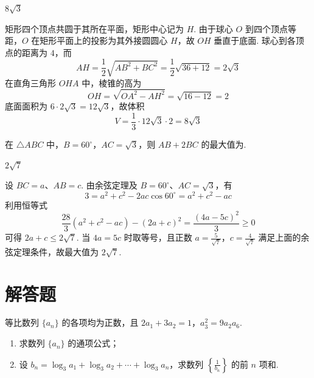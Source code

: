 \begin{answer}
\(8\sqrt{3}\)
\end{answer}

\begin{solution}
矩形四个顶点共圆于其所在平面，矩形中心记为 \(H\). 由于球心 \(O\) 到四个顶点等距，\(O\) 在矩形平面上的投影为其外接圆圆心 \(H\)，故 \(OH\) 垂直于底面. 球心到各顶点的距离为 \(4\)，而
\[
AH=\frac12\sqrt{AB^{2}+BC^{2}}
=\frac12\sqrt{36+12}=2\sqrt3
\]
在直角三角形 \(OHA\) 中，棱锥的高为
\[
OH=\sqrt{OA^{2}-AH^{2}}=\sqrt{16-12}=2
\]
底面面积为 \(6\cdot2\sqrt3=12\sqrt3\)，故体积
\[
V=\frac13\cdot12\sqrt3\cdot2=8\sqrt3
\]
\end{solution}

\begin{problem}
在 \(\triangle ABC\) 中，\(B = 60^{\circ}\)，\(AC = \sqrt{3}\)，则 \(AB + 2BC\) 的最大值为\fillinblank{}.
\end{problem}

\begin{answer}
\(2\sqrt{7}\)
\end{answer}

\begin{solution}
设 \(BC=a\)、\(AB=c\). 由余弦定理及 \(B=60^{\circ}\)、\(AC=\sqrt3\)，有
\[
3=a^{2}+c^{2}-2ac\cos60^{\circ}=a^{2}+c^{2}-ac
\]
利用恒等式
\[
\frac{28}{3}(a^{2}+c^{2}-ac)-(2a+c)^{2}=\frac{(4a-5c)^{2}}3\geqslant0
\]
可得 \(2a+c\leqslant2\sqrt7\). 当 \(4a=5c\) 时取等号，且正数 \(a=\frac{5}{\sqrt7}\)，\(c=\frac{4}{\sqrt7}\) 满足上面的余弦定理条件，故最大值为 \(2\sqrt7\).
\end{solution}

\section{解答题}

\begin{problem}
等比数列 \(\{a_{n}\}\) 的各项均为正数，且 \(2a_{1} + 3a_{2} = 1\)，\(a_{3}^{2} = 9a_{2}a_{6}\).
\begin{enumerate}
\item 求数列 \( \{a_{n}\} \) 的通项公式；
\item 设 \( b_{n} = \log_{3}a_{1} + \log_{3}a_{2} + \cdots + \log_{3}a_{n} \)，求数列 \( \left\{\frac{1}{b_{n}}\right\} \) 的前 \( n \) 项和.
\end{enumerate}
\end{problem}

